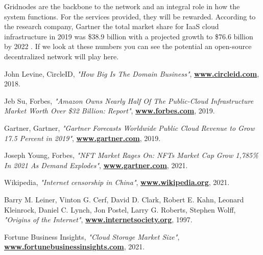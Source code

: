 \documentclass{article}
\let\oldhref\href
\renewcommand{\href}[2]{\oldhref{#1}{\bfseries#2}}
\begin{document}
\vspace{0.6cm}
\noindent Gridnodes are the backbone to the network and an integral role in how the system functions. For the services provided, they will be rewarded. According to the research company, Gartner the total market share for IaaS cloud infrastructure in 2019 was \$38.9 billion with a projected growth to \$76.6 billion by 2022 \cite{gartner2019}. If we look at these numbers you can see the potential an open-source decentralized network will play here.

\newpage
\begin{thebibliography}{999}
    John Levine, CircleID,
    \emph{"How Big Is The Domain Business"},
    \href{https://www.circleid.com/posts/20180813_how_big_is_the_domain_business/}{www.circleid.com},
    2018.

    Jeb Su, Forbes,
    \emph{"Amazon Owns Nearly Half Of The Public-Cloud Infrastructure Market Worth Over \$32 Billion: Report"},
    \href{https://www.forbes.com/sites/jeanbaptiste/2019/08/02/amazon-owns-nearly-half-of-the-public-cloud-infrastructure-market-worth-over-32-billion-report/ }{www.forbes.com},
    2019.
 
    Gartner, Gartner,
    \emph{"Gartner Forecasts Worldwide Public Cloud Revenue to Grow 17.5 Percent in 2019"},
    \href{https://www.gartner.com/en/newsroom/press-releases/2019-04-02-gartner-forecasts-worldwide-public-cloud-revenue-to-g}{www.gartner.com},
    2019.

    Joseph Young, Forbes,
    \emph{"NFT Market Rages On: NFTs Market Cap Grow 1,785\% In 2021 As Demand Explodes"},
    \href{https://www.forbes.com/sites/youngjoseph/2021/03/29/nft-market-rages-on-nfts-market-cap-grow-1785-in-2021-as-demand-explodes/
}{www.gartner.com},
    2021.
  
    Wikipedia,
    \emph{"Internet censorship in China"},
    \href{https://www.wikipedia.org/wiki/Internet_censorship_in_China}{www.wikipedia.org},
    2021.
    
    Barry M. Leiner, Vinton G. Cerf, David D. Clark, Robert E. Kahn, Leonard Kleinrock, Daniel C. Lynch, Jon Postel, Larry G. Roberts, Stephen Wolff,
    \emph{"Origins of the Internet"},
    \href{https://www.internetsociety.org/internet/history-internet/brief-history-internet}{www.internetsociety.org},
    1997.

    Fortune Business Insights,
    \emph{"Cloud Storage Market Size"},
    \href{https://www.fortunebusinessinsights.com/cloud-storage-market-102773}{www.fortunebusinessinsights.com},
    2021.
    

\end{thebibliography}
\end{document}
